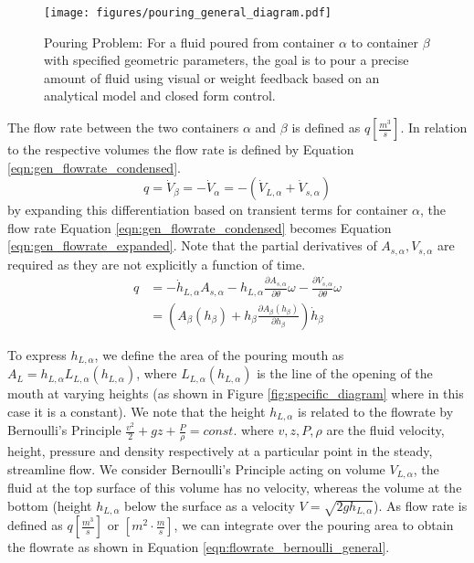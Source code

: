 \begin{figure}[h]
\centering
\texttt{[image: figures/pouring\_general\_diagram.pdf]}
\caption{Pouring Problem: For a fluid poured from container $\alpha$ to container $\beta$ with specified geometric parameters, the goal is to pour a precise amount of fluid using visual or weight feedback based on an analytical model and closed form control.}
\label{fig:general_diagram}
\end{figure}

The flow rate between the two containers $\alpha$ and $\beta$ is defined as $q [\frac{m^3}{s}]$. In relation to the respective volumes the flow rate is defined by Equation \eqref{eqn:gen_flowrate_condensed}.
\begin{equation}
q = \dot{V}_{\beta} = - \dot{V}_{\alpha} = - (\dot{V}_{L,\alpha} + \dot{V}_{s,\alpha})
\label{eqn:gen_flowrate_condensed}
\end{equation}
by expanding this differentiation based on transient terms for container $\alpha$, the flow rate Equation \eqref{eqn:gen_flowrate_condensed} becomes Equation \eqref{eqn:gen_flowrate_expanded}. Note that the partial derivatives of $ A_{s,\alpha},V_{s,\alpha}$ are required as they are not explicitly a function of time.
\begin{align}
q &= -\dot{h}_{L,\alpha} A_{s,\alpha} - h_{L,\alpha} \frac{\partial A_{s,\alpha}}{\partial \theta}\omega - \frac{\partial V_{s,\alpha}}{ \partial \theta} \omega \nonumber \\ 
&=  \left( A_{\beta}(h_{\beta}) + h_{\beta} \frac{\partial A_{\beta}(h_{\beta})}{ \partial h_{\beta}} \right) \dot{h}_{\beta}
\label{eqn:gen_flowrate_expanded}
\end{align}

To express $h_{L,\alpha}$, we define the area of the pouring mouth as $A_{L} = h_{L,\alpha} L_{L,\alpha}(h_{L,\alpha})$, where $L_{L,\alpha}(h_{L,\alpha})$ is the line of the opening of the mouth at varying heights (as shown in Figure \ref{fig:specific_diagram} where in this case it is a constant). We note that the height $h_{L,\alpha}$ is related to the flowrate by Bernoulli's Principle $\frac{v^2}{2} + gz + \frac{P}{\rho} = const.$ where $v,z,P,\rho$ are the fluid velocity, height, pressure and density respectively at a particular point in the steady, streamline flow. We consider Bernoulli's Principle acting on volume $V_{L,\alpha}$, the fluid at the top surface of this volume has no velocity, whereas the volume at the bottom (height $h_{L,\alpha}$ below the surface as a velocity $V = \sqrt{2g h_{L,\alpha}}$). As flow rate is defined as $q [\frac{m^3}{s}]$ or $[m^2 \cdot \frac{m}{s}]$, we can integrate over the pouring area to obtain the flowrate as shown in Equation \eqref{eqn:flowrate_bernoulli_general}.

